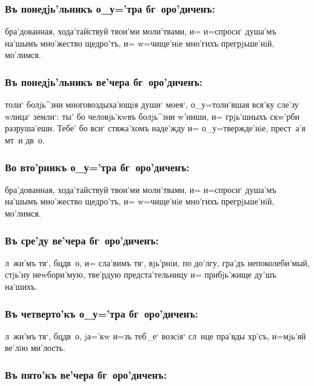 \documentclass[14pt,twoside]{extreport}
\renewcommand{\*}{~~\raise3pt\hbox{\footnotesize*}}
\begin{document}
\subsubsection{Въ понедjь'льникъ о_у='тра бг~оро'диченъ:}

бра'дованная, хода'тайствуй твои'ми мо\-ли'т\-ва\-ми, и= и=спроси` ду\-ша'мъ
на'шымъ мно'жество щедро'тъ, и= w=чище'нiе мно'гихъ пре\-грjь\-ше'\-нiй, мо'\-лим\-ся.

\subsubsection{Въ понедjь'льникъ ве'чера бг~оро'диченъ:}

толи` болjь^зни многовоздыха'ющiя души` мо\-ея`, о_у=толи'вшая вся'ку
сле'зу w\т лица` земли`: ты' бо человjь'кwвъ болjь^зни w'ниши, и=
грjь'шныхъ скw'рби разруша'еши. Тебе' бо вси` стяжа'хомъ наде'жду и=
о_у=твержде'нiе, прест~а'я мт~и дв~о.

\subsubsection{Во вто'рникъ о_у='тра бг~оро'диченъ:}

бра'дованная, хода'тайствуй твои'ми мо\-ли'т\-ва\-ми, и= и=спроси` ду\-ша'мъ
на'шымъ мно'жество щедро'тъ, и= w=чище'нiе мно'гихъ пре\-грjь\-ше'\-нiй, мо'\-лим\-ся.

\subsubsection{Въ сре'ду ве'чера бг~оро'диченъ:}

л~жи'мъ тя`, бц дв~о, и= сла'вимъ тя`, вjь'рнiи, по до'лгу, гра'дъ
непоколеби'мый, стjь'ну неwбори'мую, тве'рдую предста'тельницу и= прибjь'жище
ду'шъ на'шихъ.

\subsubsection{Въ четверто'къ о_у='тра бг~оро'диченъ:}

л~жи'мъ тя`, бц дв~о, jа='кw и=зъ теб_е` возсiя` сл~нце пра'вды
хр'съ, и=мjь'яй ве'лiю ми'лость.

\subsubsection{Въ пято'къ ве'чера бг~оро'диченъ:}
\end{document}
